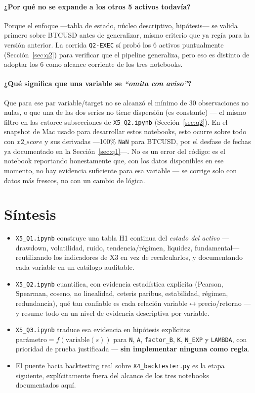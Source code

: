 \documentclass[11pt,a4paper]{article}
\newcommand{\code}[1]{\texttt{\small #1}}
\newcommand{\dq}[1]{\emph{``#1''}}
\begin{document}
\paragraph{¿Por qué no se expande a los otros 5 activos todavía?}
Porque el enfoque —tabla de estado, núcleo descriptivo, hipótesis— se valida primero sobre
BTCUSD antes de generalizar, mismo criterio que ya regía para la versión anterior. La
corrida \code{Q2-EXEC} sí probó los 6 activos puntualmente (Sección~\ref{sec:q2}) para
verificar que el pipeline generaliza, pero eso es distinto de adoptar los 6 como alcance
corriente de los tres notebooks.

\paragraph{¿Qué significa que una variable se \dq{omita con aviso}?}
Que para ese par variable/target no se alcanzó el mínimo de 30 observaciones no nulas, o
que una de las dos series no tiene dispersión (es constante) — el mismo filtro en las
catorce subsecciones de \code{X5\_Q2.ipynb} (Sección~\ref{sec:q2}). En el snapshot de Mac
usado para desarrollar estos notebooks, esto ocurre sobre todo con \(x2\_score\) y sus
derivadas —100\% \code{NaN} para BTCUSD, por el desfase de fechas ya documentado en la
Sección~\ref{sec:q1}—. No es un error del código: es el notebook reportando honestamente
que, con los datos disponibles en ese momento, no hay evidencia suficiente para esa
variable — se corrige solo con datos más frescos, no con un cambio de lógica.

\newpage
\section{Síntesis}

\begin{itemize}[leftmargin=1.4em,itemsep=4pt]
\item \code{X5\_Q1.ipynb} construye una tabla H1 continua del \emph{estado del activo} —
  drawdown, volatilidad, ruido, tendencia/régimen, liquidez, fundamental— reutilizando los
  indicadores de X3 en vez de recalcularlos, y documentando cada variable en un catálogo
  auditable.
\item \code{X5\_Q2.ipynb} cuantifica, con evidencia estadística explícita (Pearson,
  Spearman, coseno, no linealidad, ceteris paribus, estabilidad, régimen, redundancia), qué
  tan confiable es cada relación variable$\leftrightarrow$precio/retorno — y resume todo en un nivel de
  evidencia descriptiva por variable.
\item \code{X5\_Q3.ipynb} traduce esa evidencia en hipótesis explícitas
  \(\text{parámetro} = f(\text{variable}(s))\) para \code{N}, \code{A}, \code{factor\_B},
  \code{K}, \code{N\_EXP} y \code{LAMBDA}, con prioridad de prueba justificada —
  \textbf{sin implementar ninguna como regla}.
\item El puente hacia backtesting real sobre \code{X4\_backtester.py} es la etapa
  siguiente, explícitamente fuera del alcance de los tres notebooks documentados aquí.
\end{itemize}
\end{document}
